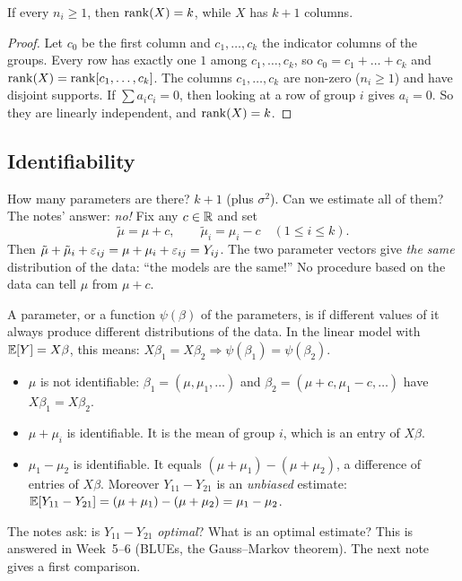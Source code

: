 \begin{proposition}\label{prop:L08-rank}
If every $n_i\ge 1$, then $\operatorname{rank}(X)=k$, while $X$ has $k+1$ columns.
\end{proposition}
\begin{proof}
Let $c_0$ be the first column and $c_1,\dots,c_k$ the indicator columns of the groups. Every row
has exactly one $1$ among $c_1,\dots,c_k$, so $c_0=c_1+\dots+c_k$ and $\operatorname{rank}(X)=\operatorname{rank}[c_1,\dots,c_k]$.
The columns $c_1,\dots,c_k$ are non-zero ($n_i\ge1$) and have disjoint supports. If
$\sum a_ic_i=0$, then looking at a row of group $i$ gives $a_i=0$. So they are linearly
independent, and $\operatorname{rank}(X)=k$.
\end{proof}

\subsection{Identifiability}
How many parameters are there? $k+1$ (plus $\sigma^2$). Can we estimate all of them? The notes'
answer: \emph{no!} Fix any $c\in\mathbb R$ and set
\[
\tilde\mu=\mu+c,\qquad \tilde\mu_i=\mu_i-c\quad(1\le i\le k).
\]
Then $\tilde\mu+\tilde\mu_i+\varepsilon_{ij}=\mu+\mu_i+\varepsilon_{ij}=Y_{ij}$. The two parameter vectors give
\emph{the same} distribution of the data: ``the models are the same!'' No procedure based on the
data can tell $\mu$ from $\mu+c$.

\begin{definition}[Identifiability]\label{def:L08-ident}
A parameter, or a function $\psi(\beta)$ of the parameters, is  if different
values of it always produce different distributions of the data. In the linear model with
$\mathbb E[Y]=X\beta$, this means: $X\beta_1=X\beta_2\Rightarrow\psi(\beta_1)=\psi(\beta_2)$.
\end{definition}

\begin{example}\label{ex:L08-ident}
\begin{itemize}
  \item $\mu$ is not identifiable: $\beta_1=(\mu,\mu_1,\dots)$ and $\beta_2=(\mu+c,\mu_1-c,\dots)$ have $X\beta_1=X\beta_2$.
  \item $\mu+\mu_i$ is identifiable. It is the mean of group $i$, which is an entry of $X\beta$.
  \item $\mu_1-\mu_2$ is identifiable. It equals $(\mu+\mu_1)-(\mu+\mu_2)$, a difference of entries of $X\beta$. Moreover $Y_{11}-Y_{21}$ is an \emph{unbiased} estimate: $\mathbb E[Y_{11}-Y_{21}]=(\mu+\mu_1)-(\mu+\mu_2)=\mu_1-\mu_2$.
\end{itemize}
The notes ask: is $Y_{11}-Y_{21}$ \emph{optimal}? What is an optimal estimate? This is answered in
Week~5--6 (BLUEs, the Gauss--Markov theorem). The next note gives a first comparison.
\end{example}

